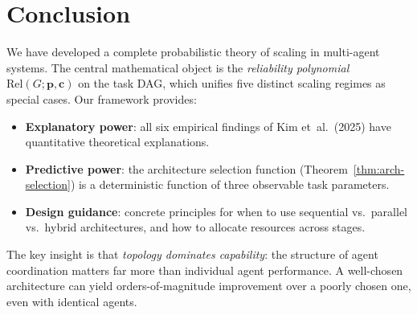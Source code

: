 \documentclass[12pt,a4paper]{article}
\theoremstyle{plain}
\theoremstyle{definition}
\theoremstyle{remark}
\newcommand{\Rel}{\mathrm{Rel}}
\begin{document}
\section{Conclusion}
\label{sec:conclusion}

We have developed a complete probabilistic theory of scaling in multi-agent
systems.  The central mathematical object is the \emph{reliability polynomial}
$\Rel(G; \mathbf{p}, \mathbf{c})$ on the task DAG, which unifies five
distinct scaling regimes as special cases.  Our framework provides:

\begin{itemize}
  \item \textbf{Explanatory power}: all six empirical findings of Kim
    et~al.\ (2025) have quantitative theoretical explanations.
  \item \textbf{Predictive power}: the architecture selection function
    (Theorem~\ref{thm:arch-selection}) is a deterministic function of
    three observable task parameters.
  \item \textbf{Design guidance}: concrete principles for when to use
    sequential vs.\ parallel vs.\ hybrid architectures, and how to
    allocate resources across stages.
\end{itemize}

The key insight is that \emph{topology dominates capability}: the
structure of agent coordination matters far more than individual agent
performance.  A well-chosen architecture can yield orders-of-magnitude
improvement over a poorly chosen one, even with identical agents.
\end{document}
